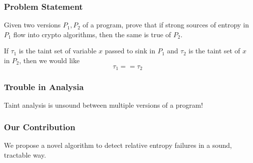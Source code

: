 \documentclass{beamer} %
\theoremstyle{definition} %
\begin{document}
\begin{frame}
\frametitle{Problem Statement}

	Given two versions $P_1, P_2$ of a program, prove that if strong sources of entropy in $P_1$ flow into crypto algorithms, then the same is true of $P_2$. 

	If $\tau_1$ is the taint set of variable $x$ passed to sink in $P_1$ and $\tau_2$ is the taint set of $x$ in $P_2$, then we would like \[\tau_1 == \tau_2\]
	


\end{frame}
{
\begin{frame}
    \frametitle{Trouble in Analysia}

    
    \begin{center}
        \Large{Taint analysis is unsound between multiple versions of a program!}
    \end{center}
\end{frame}
}

\begin{frame}
    \frametitle{Our Contribution}
    
        We propose a novel algorithm to detect relative entropy failures in a sound, tractable way.
        
    
    
    \end{frame}
\end{document}
